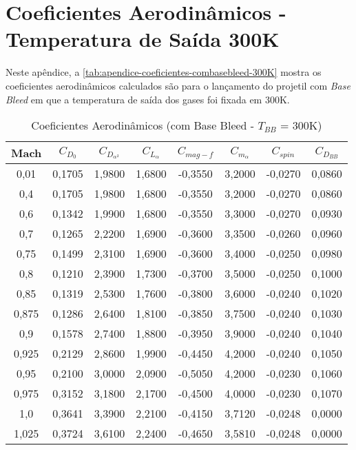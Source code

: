 \chapter{Coeficientes Aerodinâmicos - Temperatura de Saída 300K}\label{apend:apendice-combb300K}

Neste apêndice, a \autoref{tab:apendice-coeficientes-combasebleed-300K} mostra os coeficientes aerodinâmicos calculados são para o lançamento do projetil com \textit{Base Bleed} em que a temperatura de saída dos gases foi fixada em 300K.

\begin{table}[ht]
\centering
\caption[Coeficientes Aerodinâmicos (com Base Bleed - \(T_{BB}\) = 300K)]{Coeficientes Aerodinâmicos (com Base Bleed - \(T_{BB}\) = 300K)}
\vspace{0.5cm}
\begin{tabular}{c|c|c|c|c|c|c|c}
    Mach & \(C_{D_0}\) & \(C_{D_{\alpha^2}}\) & \(C_{L_\alpha}\) & \(C_{mag-f}\) & \(C_{m_{\alpha}}\) & \(C_{spin}\) & \(C_{D_{BB}}\) \\\hline
0,01  & 0,1705 & 1,9800 & 1,6800 & -0,3550 & 3,2000 & -0,0270 & 0,0860 \\
0,4   & 0,1705 & 1,9800 & 1,6800 & -0,3550 & 3,2000 & -0,0270 & 0,0860 \\
0,6   & 0,1342 & 1,9900 & 1,6800 & -0,3550 & 3,3000 & -0,0270 & 0,0930 \\
0,7   & 0,1265 & 2,2200 & 1,6900 & -0,3600 & 3,3500 & -0,0260 & 0,0960 \\
0,75  & 0,1499 & 2,3100 & 1,6900 & -0,3600 & 3,4000 & -0,0250 & 0,0980 \\
0,8   & 0,1210 & 2,3900 & 1,7300 & -0,3700 & 3,5000 & -0,0250 & 0,1000 \\
0,85  & 0,1319 & 2,5300 & 1,7600 & -0,3800 & 3,6000 & -0,0240 & 0,1020 \\
0,875 & 0,1286 & 2,6400 & 1,8100 & -0,3850 & 3,7500 & -0,0240 & 0,1030 \\
0,9   & 0,1578 & 2,7400 & 1,8800 & -0,3950 & 3,9000 & -0,0240 & 0,1040 \\
0,925 & 0,2129 & 2,8600 & 1,9900 & -0,4450 & 4,2000 & -0,0240 & 0,1050 \\
0,95  & 0,2100 & 3,0000 & 2,0900 & -0,5050 & 4,2000 & -0,0230 & 0,1060 \\
0,975 & 0,3152 & 3,1800 & 2,1700 & -0,4500 & 4,0000 & -0,0230 & 0,1070 \\
1,0   & 0,3641 & 3,3900 & 2,2100 & -0,4150 & 3,7120 & -0,0248 & 0,0000 \\
1,025 & 0,3724 & 3,6100 & 2,2400 & -0,4650 & 3,5810 & -0,0248 & 0,0000 \\

\end{tabular}
\end{table}
